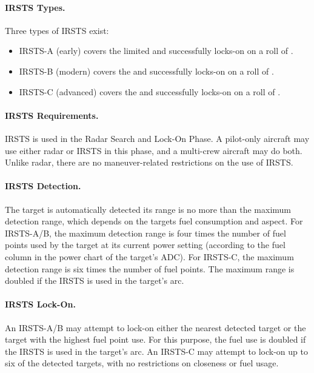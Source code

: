 {\begin{advancedrules}
{\paragraph{IRSTS Types.} Three types of IRSTS exist: 
\begin{itemize}
    \item IRSTS-A (early) covers the limited  and successfully locks-on on a roll of .
    \item IRSTS-B (modern) covers the   and successfully locks-on on a roll of .
    \item IRSTS-C (advanced) covers the   and successfully locks-on on a roll of .
    
\end{itemize}

\paragraph{IRSTS Requirements.}  IRSTS is used in the Radar Search and Lock-On Phase. A pilot-only aircraft may use either radar or IRSTS in this phase, and a multi-crew aircraft may do both. Unlike radar, there are no maneuver-related restrictions on the use of IRSTS.

\paragraph{IRSTS Detection.} The target is automatically detected its range is no more than the maximum detection range, which depends on the targets fuel consumption and aspect. For IRSTS-A/B, the maximum detection range is four times the number of fuel points used by the target at its current power setting (according to the fuel column in the power chart of the target’s ADC). For IRSTS-C, the maximum detection range is six times the number of fuel points. The maximum range is doubled if the IRSTS is used in the target’s  arc. 


\paragraph{IRSTS Lock-On.} An IRSTS-A/B may attempt to lock-on either the nearest detected target or the target with the highest fuel point use. For this purpose, the fuel use is doubled if the IRSTS is used in the target’s   arc. An IRSTS-C may attempt to lock-on up to six of the detected targets, with no restrictions on closeness or fuel usage.

}
\end{advancedrules}}
